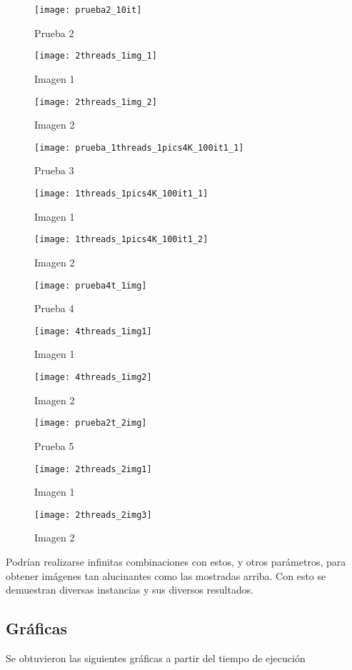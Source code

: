 \documentclass[12pt,a4paper]{article}
\begin{document}
		\begin{figure}[!htb]
			\texttt{[image: prueba2\_10it]}
			\caption{Prueba 2}
			\endminipage\hfill
			\texttt{[image: 2threads\_1img\_1]}
			\caption{Imagen 1}
			\endminipage\hfill
			\texttt{[image: 2threads\_1img\_2]}
			\caption{Imagen 2}
			\endminipage
		\end{figure}
		
		\begin{figure}[!htb]
			\texttt{[image: prueba\_1threads\_1pics4K\_100it1\_1]}
			\caption{Prueba 3}
			\endminipage\hfill
			\texttt{[image: 1threads\_1pics4K\_100it1\_1]}
			\caption{Imagen 1}
			\endminipage\hfill
			\texttt{[image: 1threads\_1pics4K\_100it1\_2]}
			\caption{Imagen 2}
			\endminipage
		\end{figure}
	
		\begin{figure}[!htb]
			\texttt{[image: prueba4t\_1img]}
			\caption{Prueba 4}
			\endminipage\hfill
			\texttt{[image: 4threads\_1img1]}
			\caption{Imagen 1}
			\endminipage\hfill
			\texttt{[image: 4threads\_1img2]}
			\caption{Imagen 2}
			\endminipage
		\end{figure}
	
		\begin{figure}[H]
			\texttt{[image: prueba2t\_2img]}
			\caption{Prueba 5}
			\endminipage\hfill
			\texttt{[image: 2threads\_2img1]}
			\caption{Imagen 1}
			\endminipage\hfill
			\texttt{[image: 2threads\_2img3]}
			\caption{Imagen 2}
			\endminipage
		\end{figure}
		
		Podrían realizarse infinitas combinaciones con estos, y otros parámetros, para obtener imágenes tan alucinantes como las mostradas arriba. Con esto se demuestran diversas instancias y sus diversos resultados.
	
		\subsection{Gráficas}
		Se obtuvieron las siguientes gráficas a partir del tiempo de ejecución
		
\end{document}
